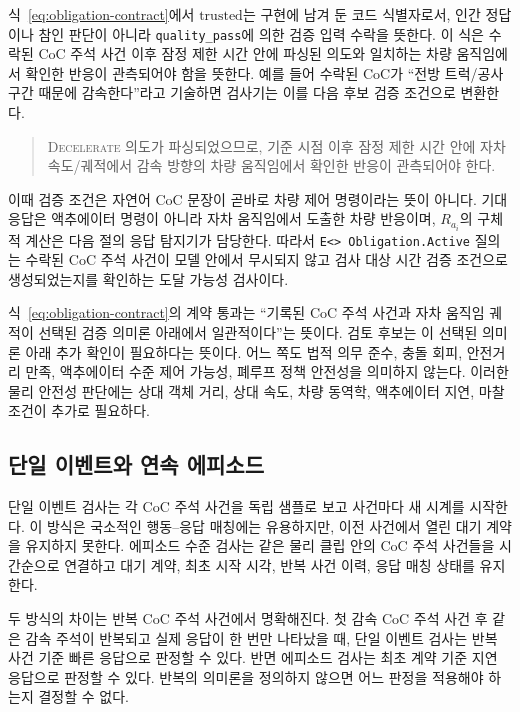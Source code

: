 식~\eqref{eq:obligation-contract}에서 \(\mathrm{trusted}\)는 구현에 남겨 둔 코드 식별자로서, 인간 정답이나 참인 판단이 아니라 \texttt{quality\_pass}에 의한 검증 입력 수락을 뜻한다. 이 식은 수락된 CoC 주석 사건 이후 잠정 제한 시간 안에 파싱된 의도와 일치하는 차량 움직임에서 확인한 반응이 관측되어야 함을 뜻한다. 예를 들어 수락된 CoC가 ``전방 트럭/공사 구간 때문에 감속한다''라고 기술하면 검사기는 이를 다음 후보 검증 조건으로 변환한다.

\begin{quote}
\small
\textsc{Decelerate} 의도가 파싱되었으므로, 기준 시점 이후 잠정 제한 시간 안에 자차 속도/궤적에서 감속 방향의 차량 움직임에서 확인한 반응이 관측되어야 한다.
\end{quote}

이때 검증 조건은 자연어 CoC 문장이 곧바로 차량 제어 명령이라는 뜻이 아니다. 기대 응답은 액추에이터 명령이 아니라 자차 움직임에서 도출한 차량 반응이며, $R_{a_i}$의 구체적 계산은 다음 절의 응답 탐지기가 담당한다. 따라서 \texttt{E<> Obligation.Active} 질의는 수락된 CoC 주석 사건이 모델 안에서 무시되지 않고 검사 대상 시간 검증 조건으로 생성되었는지를 확인하는 도달 가능성 검사이다.

식~\eqref{eq:obligation-contract}의 계약 통과는 ``기록된 CoC 주석 사건과 자차 움직임 궤적이 선택된 검증 의미론 아래에서 일관적이다''는 뜻이다. 검토 후보는 이 선택된 의미론 아래 추가 확인이 필요하다는 뜻이다. 어느 쪽도 법적 의무 준수, 충돌 회피, 안전거리 만족, 액추에이터 수준 제어 가능성, 폐루프 정책 안전성을 의미하지 않는다. 이러한 물리 안전성 판단에는 상대 객체 거리, 상대 속도, 차량 동역학, 액추에이터 지연, 마찰 조건이 추가로 필요하다.

\subsection{단일 이벤트와 연속 에피소드}
단일 이벤트 검사는 각 CoC 주석 사건을 독립 샘플로 보고 사건마다 새 시계를 시작한다. 이 방식은 국소적인 행동--응답 매칭에는 유용하지만, 이전 사건에서 열린 대기 계약을 유지하지 못한다. 에피소드 수준 검사는 같은 물리 클립 안의 CoC 주석 사건들을 시간순으로 연결하고 대기 계약, 최초 시작 시각, 반복 사건 이력, 응답 매칭 상태를 유지한다.

두 방식의 차이는 반복 CoC 주석 사건에서 명확해진다. 첫 감속 CoC 주석 사건 후 같은 감속 주석이 반복되고 실제 응답이 한 번만 나타났을 때, 단일 이벤트 검사는 반복 사건 기준 빠른 응답으로 판정할 수 있다. 반면 에피소드 검사는 최초 계약 기준 지연 응답으로 판정할 수 있다. 반복의 의미론을 정의하지 않으면 어느 판정을 적용해야 하는지 결정할 수 없다.

